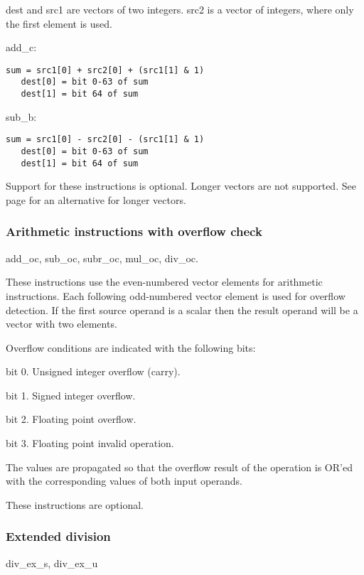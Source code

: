 \documentclass[forwardcom.tex]{subfiles}
\begin{document}
dest and src1 are vectors of two integers. src2 is a vector of integers, where only the first element is used.
\vspace{2mm}

add\_c: 
\begin{lstlisting}[frame=none]
   sum = src1[0] + src2[0] + (src1[1] & 1)
   dest[0] = bit 0-63 of sum 
   dest[1] = bit 64 of sum
\end{lstlisting}

sub\_b:
\begin{lstlisting}[frame=none]
   sum = src1[0] - src2[0] - (src1[1] & 1)
   dest[0] = bit 0-63 of sum 
   dest[1] = bit 64 of sum
\end{lstlisting}

Support for these instructions is optional. Longer vectors are not supported. See page 
\pageref{highPrecisionArithmetic} for an alternative for longer vectors.

\subsubsection{Arithmetic instructions with overflow check} \label{instructionsWithOverflowCheck}
add\_oc, sub\_oc, subr\_oc, mul\_oc, div\_oc.
\vspace{2mm}

These instructions use the even-numbered vector elements for arithmetic instructions. Each following odd-numbered vector element is used for overflow detection. If the first source operand is a scalar then the result operand will be a vector with two elements.
\vspace{2mm}

Overflow conditions are indicated with the following bits:
\vspace{2mm}

bit 0. Unsigned integer overflow (carry).

bit 1. Signed integer overflow.

bit 2. Floating point overflow.

bit 3. Floating point invalid operation.
\vspace{2mm}

The values are propagated so that the overflow result of the operation is OR'ed with the corresponding values of both input operands.
\vspace{2mm}

These instructions are optional.

\subsubsection{Extended division} \label{extendedDivisionInstruction}
div\_ex\_s, div\_ex\_u
\vspace{2mm}
\end{document}
